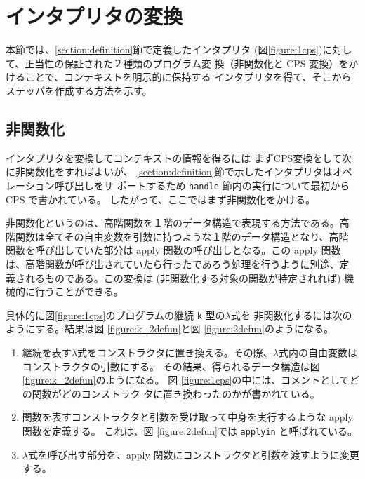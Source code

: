 \section{インタプリタの変換}
\label{section:transform}

本節では、\ref{section:definition}節で定義したインタプリタ
(図\ref{figure:1cps})に対して、正当性の保証された２種類のプログラム変
換（非関数化と CPS 変換）をかけることで、コンテキストを明示的に保持する
インタプリタを得て、そこからステッパを作成する方法を示す。

\subsection{非関数化}
\label{section:2defun}

インタプリタを変換してコンテキストの情報を得るには
まずCPS変換をして次に非関数化をすればよいが、
\ref{section:definition}節で示したインタプリタはオペレーション呼び出しをサ
ポートするため \texttt{handle} 節内の実行について最初から CPS で書かれている。
したがって、ここではまず非関数化をかける。

非関数化というのは、高階関数を１階のデータ構造で表現する方法である。高
階関数は全てその自由変数を引数に持つような１階のデータ構造となり、高階
関数を呼び出していた部分は apply 関数の呼び出しとなる。この apply 関数
は、高階関数が呼び出されていたら行ったであろう処理を行うように別途、定
義されるものである。この変換は
(非関数化する対象の関数が特定されれば)
機械的に行うことができる。

具体的に図\ref{figure:1cps}のプログラムの継続 \texttt{k} 型の$\lambda$式を
非関数化するには次のようにする。結果は図 \ref{figure:k_2defun}と図 \ref{figure:2defun}のようになる。

\begin{enumerate}
\item 継続を表す$\lambda$式をコンストラクタに置き換える。その際、$\lambda$式内の自由変数はコンストラクタの引数にする。
その結果、得られるデータ構造は図 \ref{figure:k_2defun}のようになる。
図 \ref{figure:1cps}の中には、コメントとしてどの関数がどのコンストラク
タに置き換わったのかが書かれている。
\item 関数を表すコンストラクタと引数を受け取って中身を実行するような apply 関数を定義する。
これは、図 \ref{figure:2defun}では \texttt{apply\US{}in} と呼ばれている。
\item $\lambda$式を呼び出す部分を、apply 関数にコンストラクタと引数を渡すように変更する。
\end{enumerate}

